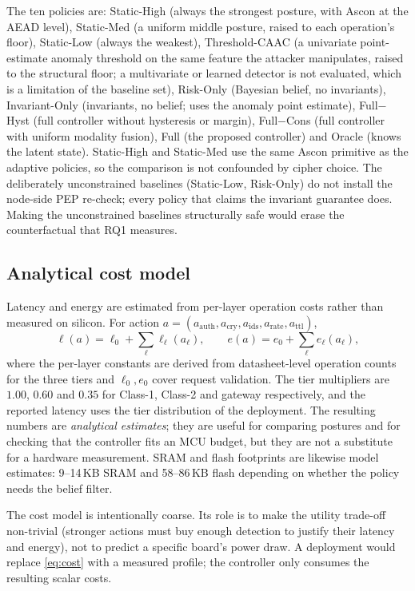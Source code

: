 The ten policies are: Static-High (always the strongest posture, with Ascon at
the AEAD level), Static-Med (a uniform middle posture, raised to each
operation's floor), Static-Low (always the weakest), Threshold-CAAC (a
univariate point-estimate anomaly threshold on the same feature the attacker
manipulates, raised to the structural floor; a multivariate or learned detector
is not evaluated, which is a limitation of the baseline set), Risk-Only
(Bayesian belief, no invariants), Invariant-Only
(invariants, no belief; uses the anomaly point estimate), Full$-$Hyst (full
controller without hysteresis or margin), Full$-$Cons (full controller with
uniform modality fusion), Full (the proposed controller) and Oracle (knows the
latent state). Static-High and Static-Med use the same Ascon primitive as the
adaptive policies, so the comparison is not confounded by cipher choice. The
deliberately unconstrained baselines (Static-Low, Risk-Only) do not install the
node-side PEP re-check; every policy that claims the invariant guarantee does.
Making the unconstrained baselines structurally safe would erase the
counterfactual that RQ1 measures.

\subsection{Analytical cost model}
\label{sec:cost-model}

Latency and energy are estimated from per-layer operation costs rather than
measured on silicon. For action
$a=(a_{\mathrm{auth}},a_{\mathrm{cry}},a_{\mathrm{ids}},a_{\mathrm{rate}},a_{\mathrm{ttl}})$,
\begin{equation}
  \ell(a)=\ell_0+\sum_{\ell}\ell_{\ell}(a_\ell),\qquad
  e(a)=e_0+\sum_{\ell}e_{\ell}(a_\ell),
  \label{eq:cost}
\end{equation}
where the per-layer constants are derived from datasheet-level operation counts
for the three tiers and $\ell_0,e_0$ cover request validation. The tier
multipliers are $1.00$, $0.60$ and $0.35$ for Class-1, Class-2 and gateway
respectively, and the reported latency uses the tier distribution of the
deployment. The resulting numbers are \emph{analytical estimates}; they are
useful for comparing postures and for checking that the controller fits an MCU
budget, but they are not a substitute for a hardware measurement. SRAM and flash
footprints are likewise model estimates: 9--14\,KB SRAM and 58--86\,KB flash
depending on whether the policy needs the belief filter.

The cost model is intentionally coarse. Its role is to make the utility
trade-off non-trivial (stronger actions must buy enough detection to justify
their latency and energy), not to predict a specific board's power draw. A
deployment would replace \eqref{eq:cost} with a measured profile; the controller
only consumes the resulting scalar costs.


